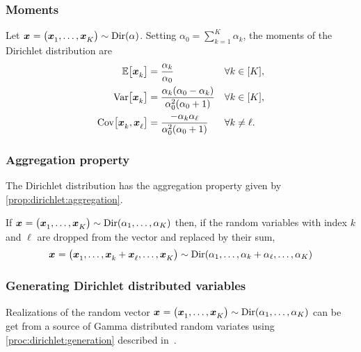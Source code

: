 \subsubsection{Moments}


Let $\va x=\bracket{\va x_1,\ldots,\va x_K}\sim \Dir\bracket{\alpha}$. Setting $\alpha_0=\sum_{k=1}^K\alpha_k$, the moments of the Dirichlet distribution are
\begin{subequations}\label{eq:dirchlet:moments}
  \begin{align}
    \espe\sqbracket{\va x_k} &= \frac{\alpha_k}{\alpha_0} && \forall k\in\range{K},
    \label{eq:dirchlet:moments:mean}
    \\
    \vari\sqbracket{\va x_k} &= \frac{\alpha_k\bracket{\alpha_0-\alpha_k}}{\alpha_0^2\bracket{\alpha_0+1}} && \forall k\in\range{K},
    \label{eq:dirchlet:moments:mean}
    \\
    \cova\sqbracket{\va x_k,\va x_{\ell}} &= \frac{-\alpha_k\alpha_{\ell}}{\alpha_0^2\bracket{\alpha_0+1}} && \forall k\ne\ell.
    \label{eq:dirchlet:moments:mean}
  \end{align}
\end{subequations}


\subsubsection{Aggregation property}


The Dirichlet distribution has the aggregation property given by \cref{prop:dirichlet:aggregation}.

\begin{prop}\label{prop:dirichlet:aggregation}
  If $\va x=\bracket{\va x_1,\ldots,\va x_K}\sim \Dir\bracket{\alpha_1,\ldots,\alpha_K}$ then, if the random variables with index $k$ and $\ell$ are dropped from the vector and replaced by their sum,
  $$\va x=\bracket{\va x_1,\ldots,\va x_k+\va x_{\ell},\ldots,\va x_K}\sim \Dir\bracket{\alpha_1,\ldots,\alpha_k+\alpha_{\ell},\ldots,\alpha_K}$$
\end{prop}



\subsubsection{Generating Dirichlet distributed variables}


Realizations of the random vector $\va x=\bracket{\va x_1,\ldots,\va x_K}\sim\Dir\bracket{\alpha_1,\ldots,\alpha_K}$ can be get from a source of Gamma distributed random variates using \cref{proc:dirichlet:generation} described in~\cite{Frigyik2010}.


